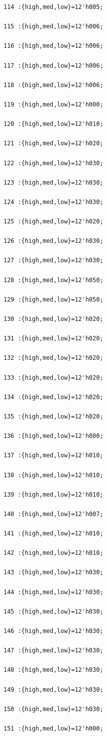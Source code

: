 \documentclass[UTF8]{ctexart}
\begin{document}
\begin{verbatim}
114 :{high,med,low}=12'h005;

115 :{high,med,low}=12'h006;

116 :{high,med,low}=12'h006;

117 :{high,med,low}=12'h006;

118 :{high,med,low}=12'h006;

119 :{high,med,low}=12'h000;

120 :{high,med,low}=12'h010;

121 :{high,med,low}=12'h020;

122 :{high,med,low}=12'h030;

123 :{high,med,low}=12'h030;

124 :{high,med,low}=12'h030;

125 :{high,med,low}=12'h020;

126 :{high,med,low}=12'h030;

127 :{high,med,low}=12'h030;

128 :{high,med,low}=12'h050;

129 :{high,med,low}=12'h050;

130 :{high,med,low}=12'h020;

131 :{high,med,low}=12'h020;

132 :{high,med,low}=12'h020;

133 :{high,med,low}=12'h020;

134 :{high,med,low}=12'h020;

135 :{high,med,low}=12'h020;

136 :{high,med,low}=12'h000;

137 :{high,med,low}=12'h010;

138 :{high,med,low}=12'h010;

139 :{high,med,low}=12'h010;

140 :{high,med,low}=12'h007;

141 :{high,med,low}=12'h010;

142 :{high,med,low}=12'h010;

143 :{high,med,low}=12'h030;

144 :{high,med,low}=12'h030;

145 :{high,med,low}=12'h030;

146 :{high,med,low}=12'h030;

147 :{high,med,low}=12'h030;

148 :{high,med,low}=12'h030;

149 :{high,med,low}=12'h030;

150 :{high,med,low}=12'h030;

151 :{high,med,low}=12'h000;


\end{verbatim}
\end{document}
